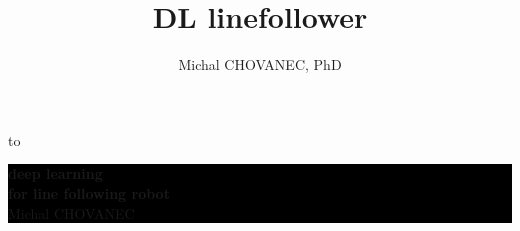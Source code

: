 \documentclass[xcolor=dvipsnames]{beamer}
\title{\bf DL linefollower}
\author{Michal CHOVANEC, PhD}
\date[EURP]{}
\begin{document}
{
    \usebackgroundtemplate
    {
        \vbox to 
    }
    \begin{frame}



    \centering
     \colorbox{black}
     {
        \begin{minipage}{7cm}
           {\LARGE \color{white} \bf deep learning \\ for line following robot} \\
           {\LARGE \color{white} Michal CHOVANEC} \\
       \end{minipage}
     }


    \end{frame}
}
\end{document}
